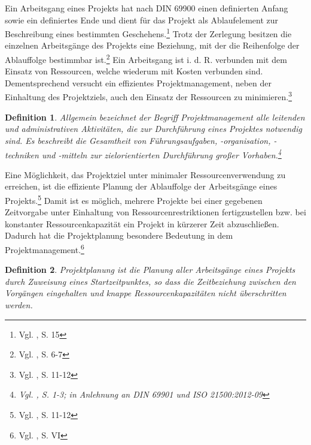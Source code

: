\documentclass[a4paper,12pt,normalheadings,footexclude,headinclude,liststotoc,nochapterprefix,onecolumn,oneside,parskip,pointlessnumbers]{scrreprt}
\newtheorem{mydef}{Definition}
\begin{document}
Ein Arbeitsgang eines Projekts hat nach DIN 69900 einen definierten Anfang sowie ein definiertes Ende und dient für das Projekt als Ablaufelement zur Beschreibung eines bestimmten Geschehens.\footnote{Vgl. \cite{69900D}, S. 15} Trotz der Zerlegung besitzen die einzelnen Arbeitsgänge des Projekts eine Beziehung, mit der die Reihenfolge der Ablauffolge bestimmbar ist.\footnote{Vgl. \cite{kellenbrink2014einfuhrung}, S. 6-7} %
Ein Arbeitsgang ist i. d. R. verbunden mit dem Einsatz von Ressourcen, welche wiederum mit Kosten verbunden sind. Dementsprechend versucht ein effizientes Projektmanagement, neben der Einhaltung des Projektziels, auch den Einsatz der Ressourcen zu minimieren.\footnote{Vgl. \cite{bartels2009projektplanung}, S. 11-12}
\begingroup
\renewcommand*{\addvspace}[1]{}
\begin{mydef}
\glqq Allgemein bezeichnet der Begriff Projektmanagement alle leitenden und administrativen Aktivitäten, die zur Durchführung eines Projektes notwendig sind. Es beschreibt die Gesamtheit von Führungsaufgaben, -organi\-sation, -techniken und -mitteln zur zielorientierten Durchführung großer Vorhaben.\grqq\footnote{Vgl. \cite{hering2014projektmanagement}, S. 1-3; in Anlehnung an DIN 69901 und ISO 21500:2012-09}
\end{mydef}
\endgroup
Eine Möglichkeit, das Projektziel unter minimaler Ressourcenverwendung zu erreichen, ist die effiziente Planung der Ablauffolge der Arbeitsgänge eines Projekts.\footnote{Vgl. \cite{bartels2009projektplanung}, S. 11-12} Damit ist es möglich, mehrere Projekte bei einer gegebenen Zeitvorgabe unter Einhaltung von Ressourcenrestriktionen fertigzustellen bzw. bei konstanter Ressourcenkapazität ein Projekt in kürzerer Zeit abzuschließen. Dadurch hat die Projektplanung besondere Bedeutung in dem Projektmanagement.\footnote{Vgl. \cite{zimmermann2006projektplanung}, S. VI\label{zum}}%
\begingroup
\renewcommand*{\addvspace}[1]{}
\begin{mydef}
\glqq Projektplanung ist die Planung aller Arbeitsgänge eines Projekts durch Zuweisung eines Startzeitpunktes, so dass die Zeitbeziehung zwischen den Vorgängen eingehalten und knappe Ressourcenkapazitäten nicht überschritten werden.\grqq{}
\end{mydef}
\end{document}
